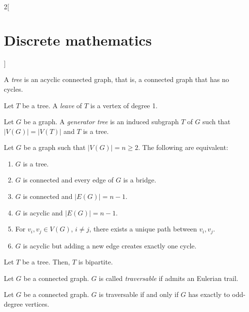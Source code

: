 \documentclass[../../../main_math.tex]{subfiles}
\begin{document}
\begin{multicols}{2}[\section{Discrete mathematics}]
  \begin{definition}
    A \emph{tree} is an acyclic connected graph, that is, a connected graph that has no cycles.
  \end{definition}
  \begin{center}
    \begin{minipage}{\linewidth}
      \centering
      
    \end{minipage}
  \end{center}
  \begin{definition}
    Let $T$ be a tree. A \emph{leave} of $T$ is a vertex of degree 1.
  \end{definition}
  \begin{definition}
    Let $G$ be a graph. A \emph{generator tree} is an induced subgraph $T$ of $G$ such that $|V(G)|=|V(T)|$ and $T$ is a tree.
  \end{definition}
  \begin{proposition}
    Let $G$ be a graph such that $|V(G)|=n\geq 2$. The following are equivalent:
    \begin{enumerate}
      \item $G$ is a tree.
      \item $G$ is connected and every edge of $G$ is a bridge.
      \item $G$ is connected and $|E(G)|=n-1$.
      \item $G$ is acyclic and $|E(G)|=n-1$.
      \item For $v_i,v_j\in V(G)$, $i\ne j$, there exists a unique path between $v_i,v_j$.
      \item $G$ is acyclic but adding a new edge creates exactly one cycle.
    \end{enumerate}
  \end{proposition}
  \begin{proposition}
    Let $T$ be a tree. Then, $T$ is bipartite.
  \end{proposition}
  \begin{definition}
    Let $G$ be a connected graph. $G$ is called \emph{traversable} if admits an Eulerian trail.
  \end{definition}
  \begin{theorem}
    Let $G$ be a connected graph. $G$ is traversable if and only if $G$ has exactly to odd-degree vertices.
  \end{theorem}
  \begin{definition}

\end{definition}
\end{multicols}
\end{document}
